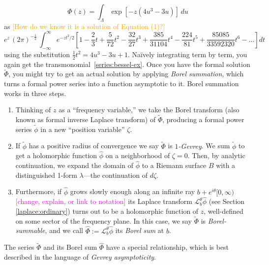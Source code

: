 \documentclass{article}
\theoremstyle{definition}
\newcommand{\series}[1]{\tilde{#1}}
\newcommand{\laplace}{\mathcal{L}}
\begin{document}
\[ \Phi(z) = \int_{\Lambda} \exp\left[-z \left(4 u^3 - 3 u\right)\right]\,du \]
as
\textcolor{orange}{[How do we know it is a solution of Equation (1)?]}
\color{orange}
\[ e^{z}\, (2\pi)^{-\tfrac{1}{2}}\, \int_{-\infty}^\infty e^{-z t^2/2} \left[ 1 - \frac{2}{3} t + \frac{5}{72} t^2 - \frac{32}{27} t^3 + \frac{385}{31104} t^4 - \frac{224}{81} t^5 + \frac{85085}{33592320} t^6 - \ldots \right] dt \]
using the substitution $\tfrac{1}{2} t^2 = 4 u^3 - 3 u + 1$. Na\"{i}vely integrating term by term, you again get the transmonomial~\eqref{series:bessel-ex}.
\color{black}
Once you have the formal solution $\series{\Phi}$, you might try to get an actual solution by applying {\em Borel summation}, which turns a formal power series into a function asymptotic to it. Borel summation works in three steps.
\begin{enumerate}
\item Thinking of $z$ as a ``frequency variable,'' we take the Borel transform (also known as formal inverse Laplace transform) of $\series{\Phi}$, producing a formal power series $\series{\phi}$ in a new ``position variable'' $\zeta$.
\item If $\series{\phi}$ has a positive radius of convergence we say $\series{\Phi}$ is {\em $1$-Gevrey}. We sum $\series{\phi}$ to get a holomorphic function $\hat{\phi}$ on a neighborhood of $\zeta = 0$. Then, by analytic continuation, we expand the domain of $\hat{\phi}$ to a Riemann surface $B$ with a distinguished 1-form $\lambda$---the continuation of $d\zeta$. %
\item Furthermore, if $\hat{\phi}$ grows slowly enough along an infinite ray $b + e^{i\theta}[0, \infty)$ \textcolor{magenta}{[change, explain, or link to notation]} its Laplace transform $\laplace_b^\theta \hat{\phi}$ (see Section \ref{laplace:ordinary}) turns out to be a holomorphic function of $z$, well-defined on some sector of the frequency plane. In this case, we say $\tilde{\Phi}$ is {\em Borel-summable}, and we call $\hat{\Phi}:=\laplace_b^\theta \hat{\phi}$ its {\em Borel sum} at $b$. 
\end{enumerate}
The series $\series{\Phi}$ and its Borel sum $\hat{\Phi}$ have a special relationship, which is best described in the language of {\em Gevrey asymptoticity}. %
\end{document}
